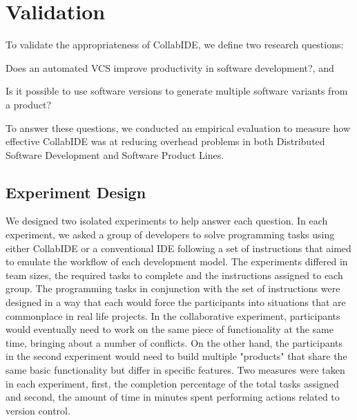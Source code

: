 

\section{Validation}
\label{sec:validation}

To validate the appropriateness of CollabIDE, we define two research questions:
\begin{enumerate*}[label=(\arabic*)]
\item Does an automated \ac{VCS} improve productivity in software development?, and
\item Is it possible to use software versions to generate multiple software variants from a product?
\end{enumerate*} 
To answer these questions, we conducted an empirical evaluation 
to measure how effective CollabIDE was at reducing overhead problems 
in both Distributed Software Development and Software Product Lines.

\subsection{Experiment Design}

We designed two isolated experiments to help answer each question. In each experiment, we asked 
a group of developers to solve programming tasks using either CollabIDE or a 
conventional IDE following a set of instructions that aimed to emulate the workflow of each 
development model. The experiments differed in team sizes, the required tasks to complete and the 
instructions assigned to each group. The programming tasks in conjunction with the set of instructions were designed in a way that each would
force the participants into situations that are commonplace in real life projects. In the collaborative experiment,
participants would eventually need to work on the same piece of functionality at the same time, bringing about a
number of conflicts. On the other hand, the participants in the second experiment would need to build multiple "products"
that share the same basic functionality but differ in specific features.
Two measures were taken in each experiment, first, the 
completion percentage of the total tasks assigned and second, the amount of time in minutes spent 
performing actions related to version control. 

